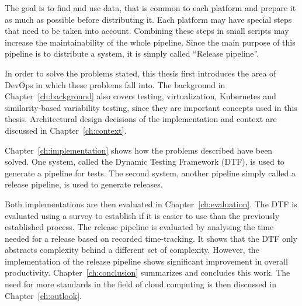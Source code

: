 The goal is to find and use data, that is common to each platform and prepare it as much as possible before distributing it.
Each platform may have special steps that need to be taken into account.
Combining these steps in small scripts may increase the maintainability of the whole pipeline.
Since the main purpose of this pipeline is to distribute a system, it is simply called ``Release pipeline''.

In order to solve the problems stated, this thesis first introduces the area of DevOps in which these problems fall into.
The background in Chapter~\ref{ch:background} also covers testing, virtualization, Kubernetes and similarity-based variability testing, since they are important concepts used in this thesis.
Architectural design decisions of the implementation and context are discussed in Chapter~\ref{ch:context}.

Chapter~\ref{ch:implementation} shows how the problems described have been solved.
One system, called the Dynamic Testing Framework (DTF), is used to generate a pipeline for tests.
The second system, another pipeline simply called a release pipeline, is used to generate releases.

\pagebreak

Both implementations are then evaluated in Chapter~\ref{ch:evaluation}.
The DTF is evaluated using a survey to establish if it is easier to use than the previously established process.
The release pipeline is evaluated by analysing the time needed for a release based on recorded time-tracking.
It shows that the DTF only abstracts complexity behind a different set of complexity.
However, the implementation of the release pipeline shows significant improvement in overall productivity.
Chapter~\ref{ch:conclusion} summarizes and concludes this work.
The need for more standards in the field of cloud computing is then discussed in Chapter~\ref{ch:outlook}.

